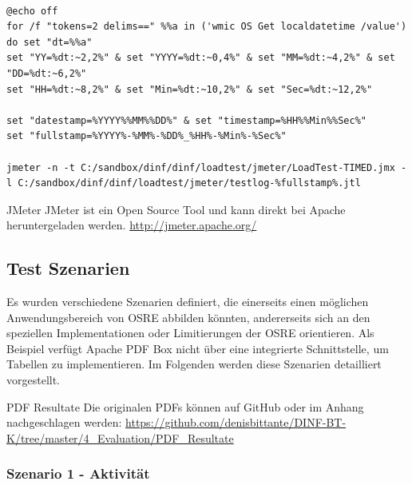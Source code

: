 \documentclass[main.tex]{subfiles}
\begin{document}
\begin{lstlisting}[language=command.com,caption={CLI Startskript},captionpos=b]

@echo off
for /f "tokens=2 delims==" %%a in ('wmic OS Get localdatetime /value') do set "dt=%%a"
set "YY=%dt:~2,2%" & set "YYYY=%dt:~0,4%" & set "MM=%dt:~4,2%" & set "DD=%dt:~6,2%"
set "HH=%dt:~8,2%" & set "Min=%dt:~10,2%" & set "Sec=%dt:~12,2%"

set "datestamp=%YYYY%%MM%%DD%" & set "timestamp=%HH%%Min%%Sec%"
set "fullstamp=%YYYY%-%MM%-%DD%_%HH%-%Min%-%Sec%"

jmeter -n -t C:/sandbox/dinf/dinf/loadtest/jmeter/LoadTest-TIMED.jmx -l C:/sandbox/dinf/dinf/loadtest/jmeter/testlog-%fullstamp%.jtl

\end{lstlisting}




\begin{reference}{JMeter}
JMeter ist ein Open Source Tool und kann direkt bei Apache heruntergeladen werden. \newline
\url{http://jmeter.apache.org/}
\end{reference}



\subsection{Test Szenarien}
Es wurden verschiedene Szenarien definiert, die einerseits einen möglichen Anwendungsbereich von OSRE abbilden könnten, andererseits sich an den speziellen Implementationen oder Limitierungen der OSRE orientieren. Als Beispiel verfügt Apache PDF Box nicht über eine integrierte Schnittstelle, um Tabellen zu implementieren. Im Folgenden werden diese Szenarien detailliert vorgestellt. 


\begin{reference}{PDF Resultate}
 Die originalen PDFs können auf GitHub oder im Anhang nachgeschlagen werden: \url{https://github.com/denisbittante/DINF-BT-K/tree/master/4_Evaluation/PDF_Resultate}
 
\end{reference}

\subsubsection{Szenario 1 - Aktivität}
\end{document}
